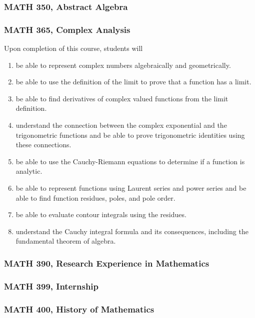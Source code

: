 \documentclass[11pt]{article}
\newenvironment{alphalist}{
  \begin{enumerate}[(1)]
    \addtolength{\itemsep}{-1.0\itemsep}}
  {\end{enumerate}}
\begin{document}
\subsubsection*{MATH 350,  Abstract Algebra}

\subsubsection*{MATH 365, Complex Analysis}

Upon completion of this course, students will 
\begin{alphalist}
    \item  be able to represent complex numbers algebraically and geometrically.
    \item be able to use the definition of the limit to prove that a function has a limit.
    \item be able to find derivatives of complex valued functions from the limit definition.
    \item understand the connection between the complex exponential and the trigonometric functions and be able to prove trigonometric identities using these connections.
    \item be able to use the Cauchy-Riemann equations to determine if a function is analytic.
    \item be able to represent functions using Laurent series and power series and be able to find function residues, poles, and pole order.
    \item be able to evaluate contour integrals using the residues.
    \item understand the Cauchy integral formula and its consequences,  including the fundamental theorem of algebra.
\end{alphalist}


\subsubsection*{MATH 390, Research Experience in Mathematics}


\subsubsection*{MATH 399, Internship}


\subsubsection*{MATH 400, History of Mathematics}
\end{document}
